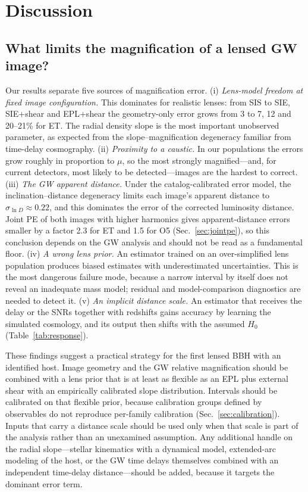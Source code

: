 \section{Discussion}
\label{sec:discussion}
\subsection{What limits the magnification of a lensed GW image?}
Our results separate five sources of magnification error. (i) \emph{Lens-model freedom at fixed image configuration.} This dominates for realistic lenses: from SIS to SIE, SIE+shear and EPL+shear the geometry-only error grows from 3 to 7, 12 and 20--21\% for ET. The radial density slope is the most important unobserved parameter, as expected from the slope--magnification degeneracy familiar from time-delay cosmography. (ii) \emph{Proximity to a caustic.} In our populations the errors grow roughly in proportion to $\mu$, so the most strongly magnified---and, for current detectors, most likely to be detected---images are the hardest to correct. (iii) \emph{The GW apparent distance.} Under the catalog-calibrated error model, the inclination--distance degeneracy limits each image's apparent distance to $\sigma_{\ln D}\approx0.22$, and this dominates the error of the corrected luminosity distance. Joint PE of both images with higher harmonics gives apparent-distance errors smaller by a factor 2.3 for ET and 1.5 for O5 (Sec.~\ref{sec:jointpe}), so this conclusion depends on the GW analysis and should not be read as a fundamental floor. (iv) \emph{A wrong lens prior.} An estimator trained on an over-simplified lens population produces biased estimates with underestimated uncertainties. This is the most dangerous failure mode, because a narrow interval by itself does not reveal an inadequate mass model; residual and model-comparison diagnostics are needed to detect it. (v) \emph{An implicit distance scale.} An estimator that receives the delay or the SNRs together with redshifts gains accuracy by learning the simulated cosmology, and its output then shifts with the assumed $H_0$ (Table~\ref{tab:response}).

These findings suggest a practical strategy for the first lensed BBH with an identified host. Image geometry and the GW relative magnification should be combined with a lens prior that is at least as flexible as an EPL plus external shear with an empirically calibrated slope distribution. Intervals should be calibrated on that flexible prior, because calibration groups defined by observables do not reproduce per-family calibration (Sec.~\ref{sec:calibration}). Inputs that carry a distance scale should be used only when that scale is part of the analysis rather than an unexamined assumption. Any additional handle on the radial slope---stellar kinematics with a dynamical model, extended-arc modeling of the host, or the GW time delays themselves combined with an independent time-delay distance---should be added, because it targets the dominant error term.

